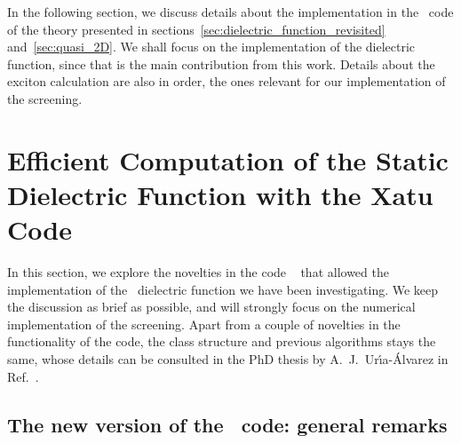 In the following section, we discuss details about the implementation in the \xatu~code of the theory presented in sections~\ref{sec:dielectric_function_revisited} and~\ref{sec:quasi_2D}.
We shall focus on the implementation of the dielectric function, since that is the main contribution from this work.
Details about the exciton calculation are also in order, the ones relevant for our implementation of the screening.

\section{Efficient Computation of the Static Dielectric Function with the Xatu Code}
\label{sec:xatu_code}

In this section, we explore the novelties in the code \xatu~\cite{Xatu} that allowed the implementation of the \bd~dielectric function we have been investigating.
We keep the discussion as brief as possible, and will strongly focus on the numerical implementation of the screening.
Apart from a couple of novelties in the functionality of the code, the class structure and previous algorithms stays the same, whose details can be consulted in the PhD thesis by A.~J.~Ur\'{\i}a-\'Alvarez in Ref.~\cite{Alex_PhD}.

\subsection{The new version of the \xatu~code: general remarks}
\label{subsec:new_xatu}

